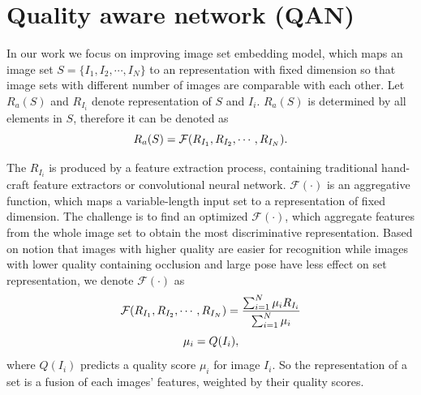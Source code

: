 \section{Quality aware network (QAN)}

In our work we focus on improving image set embedding model, which maps an image set $S=\{I_1, I_2, \cdots, I_N\}$ to an representation with fixed dimension so that image sets with different number of images are comparable with each other. Let $R_a(S)$ and $R_{I_i}$ denote representation of $S$ and $I_i$. $R_a(S)$ is determined by all elements in $S$, therefore it can be denoted as
\begin{equation}
\small
\label{3}
R_a(S) = \mathcal{F}(R_{I_1}, R_{I_2}, \cdots, R_{I_N}).
\end{equation}

The $R_{I_i}$ is produced by a feature extraction process, containing  traditional hand-craft feature extractors or convolutional neural network.  $\mathcal{F}(\cdot)$ is an aggregative function, which maps a variable-length input set to a representation of fixed dimension. The challenge is to find an optimized $\mathcal{F}(\cdot)$, which aggregate features from the whole image set to obtain the most discriminative representation. 
Based on notion that images with higher quality are easier for recognition while images with lower quality containing occlusion and large pose have less effect on set representation, we denote $\mathcal{F}(\cdot)$ as
\begin{equation}
\small
\label{5}
\mathcal{F}(R_{I_1}, R_{I_2}, \cdots, R_{I_N}) =\frac{\sum_{i=1}^N\mu_i R_{I_i}}{\sum_{i=1}^N\mu_i }
\end{equation}
\begin{equation}
\small
\label{6}
\mu_i = Q(I_i),
\end{equation}
where $Q(I_i)$ predicts a quality score $\mu_i$ for image $I_i$. So the representation of a set is a fusion of each images' features, weighted by their quality scores.

